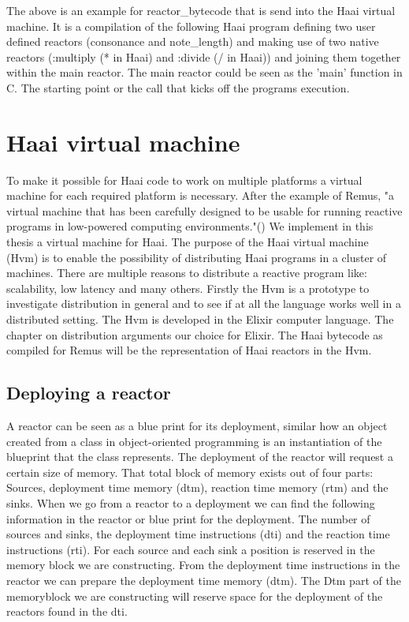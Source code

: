 \documentclass[a4paper]{book}
\begin{document}
The above is an example for reactor\_bytecode that is send into the Haai virtual machine. It is a compilation of the following Haai program defining two user defined reactors (consonance and note\_length) and making use of two native reactors (:multiply (* in Haai) and :divide (/ in Haai)) and joining them together within the main reactor. The main reactor could be seen as the 'main' function in C. The starting point or the call that kicks off the programs execution.


\chapter{Haai virtual machine}
To make it possible for Haai code to work on multiple platforms a virtual machine for each required platform is necessary. After the example of Remus, "a virtual machine that has been carefully designed to be usable for running reactive programs in low-powered computing environments."(\cite{oeyen_remus_2022}) We implement in this thesis a virtual machine for Haai. The purpose of the Haai virtual machine (Hvm) is to enable the possibility of distributing Haai programs in a cluster of machines. There are multiple reasons to distribute a reactive program like: scalability, low latency and many others. Firstly the Hvm is a prototype to investigate distribution in general and to see if at all the language works well in a distributed setting. The Hvm is developed  in the Elixir computer language. The chapter on distribution arguments our choice for Elixir. The Haai bytecode as compiled for Remus will be the representation of Haai reactors in the Hvm. 

\section{Deploying a reactor}
A reactor can be seen as a blue print for its deployment, similar how an object created from a class in object-oriented programming is an instantiation of the blueprint that the class represents. The deployment of the reactor will request a certain size of memory. That total block of memory exists out of four parts: Sources, deployment time memory (dtm), reaction time memory (rtm) and the sinks. When we go from a reactor to a deployment we can find the following information in the reactor or blue print for the deployment. The number of sources and sinks, the deployment time instructions (dti) and the reaction time instructions (rti). For each source and each sink a position is reserved in the memory block we are constructing. From the deployment time instructions in the reactor we can prepare the deployment time memory (dtm). The Dtm part of the memoryblock we are constructing will reserve space for the deployment of the reactors found in the dti. 
\end{document}
